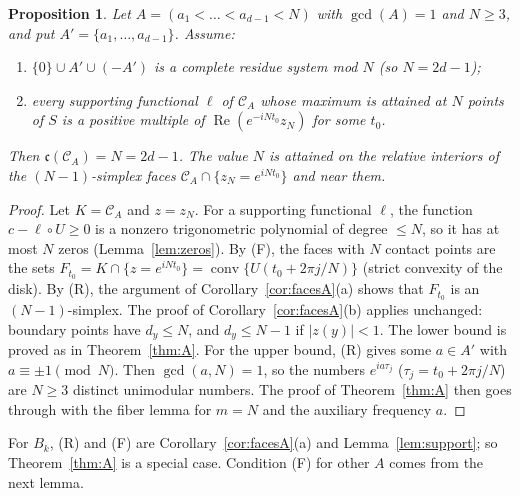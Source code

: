 \documentclass[11pt]{amsart}
\newtheorem{proposition}[theorem]{Proposition}
\theoremstyle{remark}
\newcommand{\cc}{\mathfrak{c}}
\newcommand{\conv}{\operatorname{conv}}
\newcommand{\re}{\operatorname{Re}}
\begin{document}
\begin{proposition}\label{prop:general}
Let $A=(a_1<\dots<a_{d-1}<N)$ with $\gcd(A)=1$ and $N\ge3$, and put $A'=\{a_1,\dots,a_{d-1}\}$. Assume:
\begin{enumerate}
\item[(R)] $\{0\}\cup A'\cup(-A')$ is a complete residue system mod $N$ (so $N=2d-1$);
\item[(F)] every supporting functional $\ell$ of $\mathcal C_A$ whose maximum is attained at $N$ points of $S$ is a positive multiple of $\re(e^{-iNt_0}z_N)$ for some $t_0$.
\end{enumerate}
Then $\cc(\mathcal C_A)=N=2d-1$. The value $N$ is attained on the relative interiors of the $(N-1)$-simplex faces $\mathcal C_A\cap\{z_N=e^{iNt_0}\}$ and near them.
\end{proposition}
\begin{proof}
Let $K=\mathcal C_A$ and $z=z_N$. For a supporting functional $\ell$, the function $c-\ell\circ U\ge0$ is a nonzero trigonometric polynomial of degree $\le N$, so it has at most $N$ zeros
(Lemma~\ref{lem:zeros}). By (F), the faces with $N$ contact points are the sets $F_{t_0}=K\cap\{z=e^{iNt_0}\}=\conv\{U(t_0+2\pi j/N)\}$ (strict convexity of the disk).
By (R), the argument of Corollary~\ref{cor:facesA}(a) shows that $F_{t_0}$ is an $(N-1)$-simplex. The proof of Corollary~\ref{cor:facesA}(b) applies unchanged: boundary points have $d_y\le N$,
and $d_y\le N-1$ if $|z(y)|<1$. The lower bound is proved as in Theorem~\ref{thm:A}. For the upper bound, (R) gives some $a\in A'$ with $a\equiv\pm1\pmod N$. Then $\gcd(a,N)=1$, so the
numbers $e^{ia\tau_j}$ ($\tau_j=t_0+2\pi j/N$) are $N\ge3$ distinct unimodular numbers. The proof of Theorem~\ref{thm:A} then goes through with the fiber lemma for $m=N$ and the auxiliary frequency $a$.
\end{proof}

\noindent For $B_k$, (R) and (F) are Corollary~\ref{cor:facesA}(a) and Lemma~\ref{lem:support}; so Theorem~\ref{thm:A} is a special case. Condition (F) for other $A$ comes from the next lemma.
\end{document}

